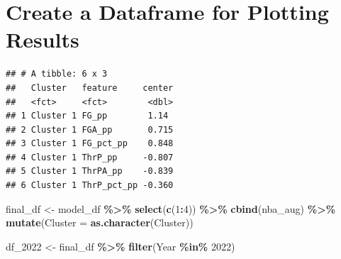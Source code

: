 \documentclass[
]{article}
\newenvironment{Shaded}{\begin{snugshade}}{\end{snugshade}}
\newcommand{\AttributeTok}[1]{\textcolor[rgb]{0.13,0.29,0.53}{#1}}
\newcommand{\CommentTok}[1]{\textcolor[rgb]{0.56,0.35,0.01}{\textit{#1}}}
\newcommand{\DecValTok}[1]{\textcolor[rgb]{0.00,0.00,0.81}{#1}}
\newcommand{\FunctionTok}[1]{\textcolor[rgb]{0.13,0.29,0.53}{\textbf{#1}}}
\newcommand{\NormalTok}[1]{#1}
\newcommand{\OtherTok}[1]{\textcolor[rgb]{0.56,0.35,0.01}{#1}}
\newcommand{\SpecialCharTok}[1]{\textcolor[rgb]{0.81,0.36,0.00}{\textbf{#1}}}
\newcommand{\StringTok}[1]{\textcolor[rgb]{0.31,0.60,0.02}{#1}}
\begin{document}
\hypertarget{create-a-dataframe-for-plotting-results}{%
\section{Create a Dataframe for Plotting
Results}\label{create-a-dataframe-for-plotting-results}}

\begin{Shaded}
\end{Shaded}

\begin{verbatim}
## # A tibble: 6 x 3
##   Cluster   feature     center
##   <fct>     <fct>        <dbl>
## 1 Cluster 1 FG_pp        1.14 
## 2 Cluster 1 FGA_pp       0.715
## 3 Cluster 1 FG_pct_pp    0.848
## 4 Cluster 1 ThrP_pp     -0.807
## 5 Cluster 1 ThrPA_pp    -0.839
## 6 Cluster 1 ThrP_pct_pp -0.360
\end{verbatim}

\begin{Shaded}
\begin{Highlighting}[]
\NormalTok{final\_df }\OtherTok{\textless{}{-}}\NormalTok{ model\_df }\SpecialCharTok{\%\textgreater{}\%}
  \FunctionTok{select}\NormalTok{(}\FunctionTok{c}\NormalTok{(}\DecValTok{1}\SpecialCharTok{:}\DecValTok{4}\NormalTok{)) }\SpecialCharTok{\%\textgreater{}\%}
  \FunctionTok{cbind}\NormalTok{(nba\_aug) }\SpecialCharTok{\%\textgreater{}\%}
  \FunctionTok{mutate}\NormalTok{(}\AttributeTok{Cluster =} \FunctionTok{as.character}\NormalTok{(Cluster))}

\NormalTok{df\_2022 }\OtherTok{\textless{}{-}}\NormalTok{ final\_df }\SpecialCharTok{\%\textgreater{}\%}
  \FunctionTok{filter}\NormalTok{(Year }\SpecialCharTok{\%in\%} \StringTok{\textquotesingle{}2022\textquotesingle{}}\NormalTok{)}
\end{Highlighting}
\end{Shaded}
\end{document}
